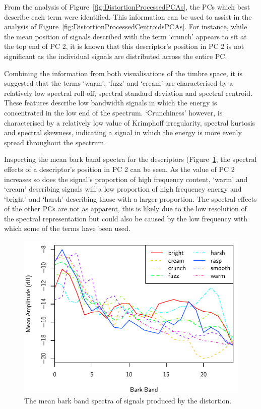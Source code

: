 			From the analysis of Figure~\ref{fig:DistortionProcessedPCAs}, the PCs which best describe each
			term were identified. This information can be used to assist in the analysis of
			Figure~\ref{fig:DistortionProcessedCentroidsPCAs}. For instance, while the mean position of signals
			described with the term `crunch' appears to sit at the top end of PC 2, it is known that this
			descriptor's position in PC 2 is not significant as the individual signals are distributed across
			the entire PC.

			Combining the information from both visualisations of the timbre space, it is suggested that the
			terms `warm', `fuzz' and `cream' are characterised by a relatively low spectral roll off, spectral
			standard deviation and spectral centroid. These features describe low bandwidth signals in which
			the energy is concentrated in the low end of the spectrum. `Crunchiness' however, is characterised
			by a relatively low value of Krimphoff irregularity, spectral kurtosis and spectral skewness,
			indicating a signal in which the energy is more evenly spread throughout the spectrum.

			Inspecting the mean bark band spectra for the descriptors
			(Figure~\ref{fig:DistortionProcessedSpectra}, the spectral effects of a descriptor's position in PC
			2 can be seen. As the value of PC 2 increases so does the signal's proportion of high frequency
			content, `warm' and `cream' describing signals will a low proportion of high frequency energy and
			`bright' and `harsh' describing those with a larger proportion. The spectral effects of the other
			PCs are not as apparent, this is likely due to the low resolution of the spectral representation
			but could also be caused by the low frequency with which some of the terms have been used.

			\begin{figure}[h!]
				\centering
				\includegraphics{chapter4/Images/DistortionProcessedSpectra.pdf}
				\caption{The mean bark band spectra of signals produced by the distortion.}
				\label{fig:DistortionProcessedSpectra}
			\end{figure}

